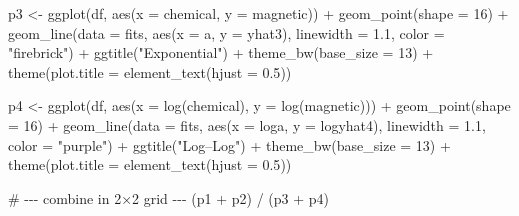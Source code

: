 \documentclass[
  letterpaper,
  DIV=11,
  numbers=noendperiod]{scrreprt}
\newenvironment{Shaded}{\begin{snugshade}}{\end{snugshade}}
\newcommand{\AttributeTok}[1]{\textcolor[rgb]{0.40,0.45,0.13}{#1}}
\newcommand{\CommentTok}[1]{\textcolor[rgb]{0.37,0.37,0.37}{#1}}
\newcommand{\DecValTok}[1]{\textcolor[rgb]{0.68,0.00,0.00}{#1}}
\newcommand{\FloatTok}[1]{\textcolor[rgb]{0.68,0.00,0.00}{#1}}
\newcommand{\FunctionTok}[1]{\textcolor[rgb]{0.28,0.35,0.67}{#1}}
\newcommand{\NormalTok}[1]{\textcolor[rgb]{0.00,0.23,0.31}{#1}}
\newcommand{\OtherTok}[1]{\textcolor[rgb]{0.00,0.23,0.31}{#1}}
\newcommand{\SpecialCharTok}[1]{\textcolor[rgb]{0.37,0.37,0.37}{#1}}
\newcommand{\StringTok}[1]{\textcolor[rgb]{0.13,0.47,0.30}{#1}}
\begin{document}
\begin{Shaded}
\begin{Highlighting}[]
\NormalTok{p3 }\OtherTok{\textless{}{-}} \FunctionTok{ggplot}\NormalTok{(df, }\FunctionTok{aes}\NormalTok{(}\AttributeTok{x =}\NormalTok{ chemical, }\AttributeTok{y =}\NormalTok{ magnetic)) }\SpecialCharTok{+}
  \FunctionTok{geom\_point}\NormalTok{(}\AttributeTok{shape =} \DecValTok{16}\NormalTok{) }\SpecialCharTok{+}
  \FunctionTok{geom\_line}\NormalTok{(}\AttributeTok{data =}\NormalTok{ fits, }\FunctionTok{aes}\NormalTok{(}\AttributeTok{x =}\NormalTok{ a, }\AttributeTok{y =}\NormalTok{ yhat3), }\AttributeTok{linewidth =} \FloatTok{1.1}\NormalTok{, }\AttributeTok{color =} \StringTok{"firebrick"}\NormalTok{) }\SpecialCharTok{+}
  \FunctionTok{ggtitle}\NormalTok{(}\StringTok{"Exponential"}\NormalTok{) }\SpecialCharTok{+}
  \FunctionTok{theme\_bw}\NormalTok{(}\AttributeTok{base\_size =} \DecValTok{13}\NormalTok{) }\SpecialCharTok{+}
  \FunctionTok{theme}\NormalTok{(}\AttributeTok{plot.title =} \FunctionTok{element\_text}\NormalTok{(}\AttributeTok{hjust =} \FloatTok{0.5}\NormalTok{))}

\NormalTok{p4 }\OtherTok{\textless{}{-}} \FunctionTok{ggplot}\NormalTok{(df, }\FunctionTok{aes}\NormalTok{(}\AttributeTok{x =} \FunctionTok{log}\NormalTok{(chemical), }\AttributeTok{y =} \FunctionTok{log}\NormalTok{(magnetic))) }\SpecialCharTok{+}
  \FunctionTok{geom\_point}\NormalTok{(}\AttributeTok{shape =} \DecValTok{16}\NormalTok{) }\SpecialCharTok{+}
  \FunctionTok{geom\_line}\NormalTok{(}\AttributeTok{data =}\NormalTok{ fits, }\FunctionTok{aes}\NormalTok{(}\AttributeTok{x =}\NormalTok{ loga, }\AttributeTok{y =}\NormalTok{ logyhat4), }\AttributeTok{linewidth =} \FloatTok{1.1}\NormalTok{, }\AttributeTok{color =} \StringTok{"purple"}\NormalTok{) }\SpecialCharTok{+}
  \FunctionTok{ggtitle}\NormalTok{(}\StringTok{"Log–Log"}\NormalTok{) }\SpecialCharTok{+}
  \FunctionTok{theme\_bw}\NormalTok{(}\AttributeTok{base\_size =} \DecValTok{13}\NormalTok{) }\SpecialCharTok{+}
  \FunctionTok{theme}\NormalTok{(}\AttributeTok{plot.title =} \FunctionTok{element\_text}\NormalTok{(}\AttributeTok{hjust =} \FloatTok{0.5}\NormalTok{))}

\CommentTok{\# {-}{-}{-} combine in 2×2 grid {-}{-}{-}}
\NormalTok{(p1 }\SpecialCharTok{+}\NormalTok{ p2) }\SpecialCharTok{/}\NormalTok{ (p3 }\SpecialCharTok{+}\NormalTok{ p4)}
\end{Highlighting}
\end{Shaded}
\end{document}
